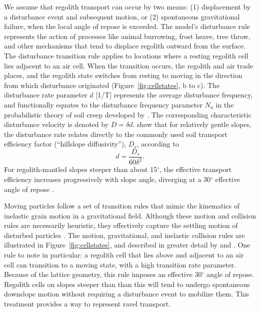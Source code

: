 We assume that regolith transport can occur by two means: (1) displacement by a disturbance event and subsequent motion, or (2) spontaneous gravitational failure, when the local angle of repose is exceeded. The model's disturbance rule represents the action of processes like animal burrowing, frost heave, tree throw, and other mechanisms that tend to displace regolith outward from the surface. The disturbance transition rule applies to locations where a resting regolith cell lies adjacent to an air cell. When the transition occurs, the regolith and air trade places, and the regolith state switches from resting to moving in the direction from which disturbance originated (Figure~\ref{fig:cellstates}, b to c). The disturbance rate parameter $d$ [1/T] represents the average disturbance frequency, and functionally equates to the disturbance frequency parameter $N_a$ in the probabilistic theory of soil creep developed by \citet{furbish2009statistical}. The corresponding characteristic disturbance velocity is denoted by $D=\delta d$.  \citet{tucker2018lattice} show that for relatively gentle slopes, the disturbance rate relates directly to the commonly used soil transport efficiency factor (``hillslope diffusivity''), $D_s$, according to
\begin{equation}
d = \frac{D_s}{60 \delta^2}.
\end{equation}
For regolith-mantled slopes steeper than about 15$^\circ$, the effective transport efficiency increases progressively with slope angle, diverging at a 30$^\circ$ effective angle of repose \citep[][their Figure 10]{tucker2018lattice}.

Moving particles follow a set of transition rules that mimic the kinematics of inelastic grain motion in a gravitational field. Although these motion and collision rules are necessarily heuristic, they effectively capture the settling motion of disturbed particles \citep{furbish2009statistical}. The motion, gravitational, and inelastic collision rules are illustrated in Figure~\ref{fig:cellstates}, and described in greater detail by \citet{tucker2016celllab} and \citet{tucker2018lattice}. One rule to note in particular: a regolith cell that lies above and adjacent to an air cell can transition to a moving state, with a high transition rate parameter. Because of the lattice geometry, this rule imposes an effective 30$^\circ$ angle of repose. Regolith cells on slopes steeper than than this will tend to undergo spontaneous downslope motion without requiring a disturbance event to mobilize them. This treatment provides a way to represent ravel transport.


